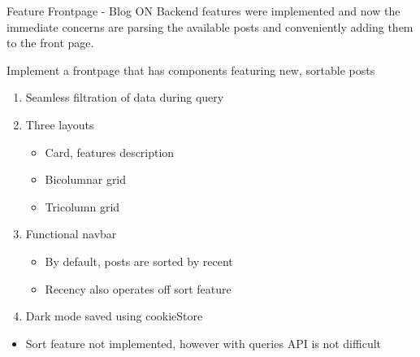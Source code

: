 \documentclass[7px]{article}
\begin{document}
\frontmatter
{Feature}
{Frontpage - Blog}
{ON}
{Backend features were implemented and now the immediate concerns are parsing the available posts and conveniently adding them to the front page.}

\strategy
{Implement a frontpage that has components featuring new, sortable posts}
{
  \begin{enumerate}
    \item Seamless filtration of data during query
    \item Three layouts
      \small{
        \begin{itemize}[label=$\multimapdotinv$, leftmargin=1.7mm]
          \item Card, features description
          \item Bicolumnar grid
          \item Tricolumn grid
        \end{itemize}
      }
      \normalsize
    \item Functional navbar
      \small{
        \begin{itemize}[label=$\multimapdotinv$, leftmargin=1.7mm]
          \item By default, posts are sorted by recent
          \item Recency also operates off sort feature
        \end{itemize}
      }
    \item Dark mode saved using cookieStore
  \end{enumerate}
}
{
  \begin{itemize}[label=\textsection]
  \end{itemize}
}
{
  \raggedright
  \begin{itemize}[label=\blitzb]
    \small
    \item Sort feature not implemented, however with queries API is not difficult
  \end{itemize}
  }


  
\end{document}
